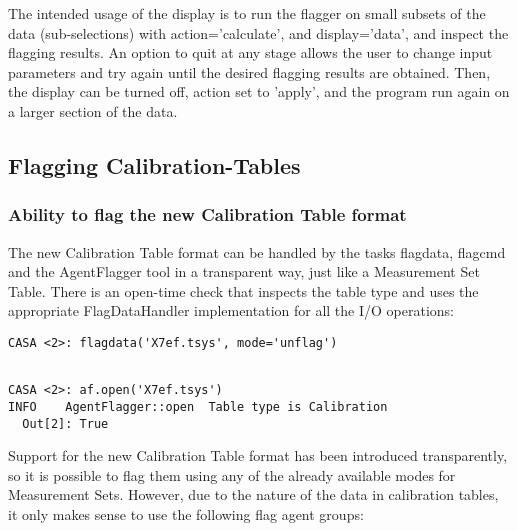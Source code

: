 The intended usage of the display is to run the flagger on small subsets of the data (sub-selections)
with action='calculate', and display='data', and inspect the flagging results. 
An option to quit at any stage allows the user to change input parameters and try again until the
desired flagging results are obtained.  Then, the display can be turned off,
action set to 'apply', and the program run again on a larger section of the
data.


\subsection{Flagging Calibration-Tables}

\subsubsection{Ability to flag the new Calibration Table format}

The new Calibration Table format can be handled by the tasks flagdata, flagcmd and the
AgentFlagger tool in a
transparent way, just like a Measurement Set Table. There is an open-time check
that inspects the table type and uses the appropriate FlagDataHandler
implementation for all the I/O operations:


\begin{verbatim}
CASA <2>: flagdata('X7ef.tsys', mode='unflag')
\end{verbatim}

\begin{verbatim}

CASA <2>: af.open('X7ef.tsys')
INFO	AgentFlagger::open	Table type is Calibration
  Out[2]: True

\end{verbatim}

Support for the new Calibration Table format has been introduced
transparently, so it is possible to flag them using any of the already available
modes for Measurement Sets. However, due to the nature of the data in
calibration tables, it only makes sense to use the following flag agent groups:


